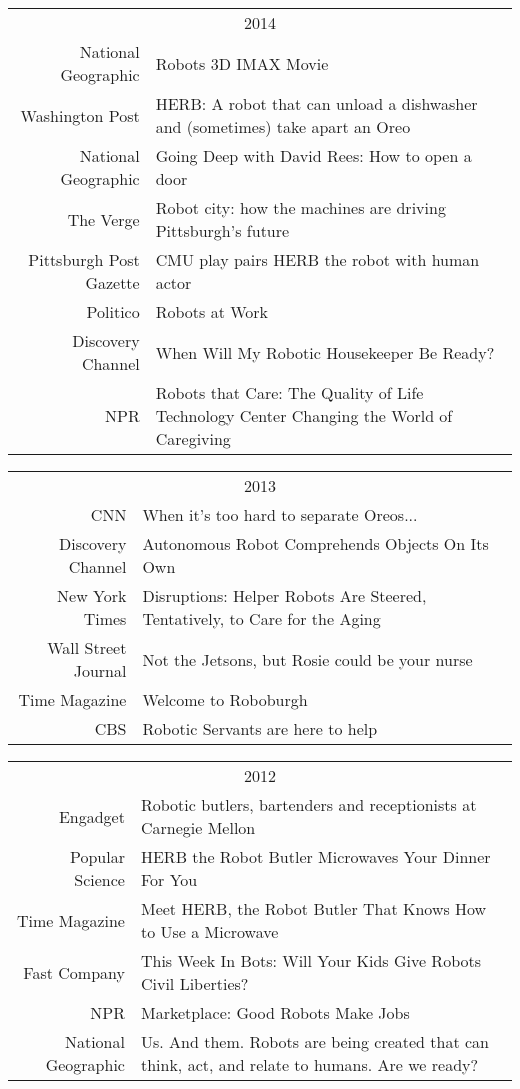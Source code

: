 \begin{tabularx}{\linewidth}{rX}
\multicolumn{2}{c}{2014}\\ 
National Geographic & Robots 3D IMAX Movie\\
Washington Post & HERB: A robot that can unload a dishwasher and (sometimes) take apart an Oreo\\
National Geographic & Going Deep with David Rees: How to open a door\\
The Verge & Robot city: how the machines are driving Pittsburgh's future\\
Pittsburgh Post Gazette & CMU play pairs HERB the robot with human actor\\
Politico & Robots at Work\\
Discovery Channel & When Will My Robotic Housekeeper Be Ready?\\
NPR & Robots that Care: The Quality of Life Technology Center Changing the World of Caregiving\\
\end{tabularx}
\begin{tabularx}{\linewidth}{rX}
\multicolumn{2}{c}{2013}\\ 
CNN & When it's too hard to separate Oreos...\\
Discovery Channel & 	Autonomous Robot Comprehends Objects On Its Own\\
New York Times & Disruptions: Helper Robots Are Steered, Tentatively, to Care for the Aging\\
Wall Street Journal & Not the Jetsons, but Rosie could be your nurse\\
Time Magazine & Welcome to Roboburgh\\
CBS & Robotic Servants are here to help\\
\end{tabularx}
\begin{tabularx}{\linewidth}{rX}
\multicolumn{2}{c}{2012}\\ 
Engadget & {Robotic butlers, bartenders and receptionists at Carnegie Mellon}\\
Popular Science & {HERB the Robot Butler Microwaves Your Dinner For You}\\
Time Magazine & {Meet HERB, the Robot Butler That Knows How to Use a Microwave}\\
Fast Company & {This Week In Bots: Will Your Kids Give Robots Civil Liberties?}\\
NPR & {Marketplace: Good Robots Make Jobs}\\
National Geographic & {Us. And them.
Robots are being created that can think, act, and relate to humans. Are we ready?}\\
\end{tabularx}

